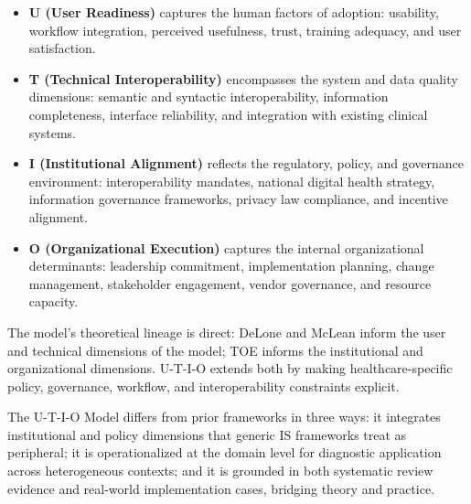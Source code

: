 \begin{itemize}
    \item \textbf{U (User Readiness)} captures the human factors of adoption: usability, workflow integration, perceived usefulness, trust, training adequacy, and user satisfaction.
    \item \textbf{T (Technical Interoperability)} encompasses the system and data quality dimensions: semantic and syntactic interoperability, information completeness, interface reliability, and integration with existing clinical systems.
    \item \textbf{I (Institutional Alignment)} reflects the regulatory, policy, and governance environment: interoperability mandates, national digital health strategy, information governance frameworks, privacy law compliance, and incentive alignment.
    \item \textbf{O (Organizational Execution)} captures the internal organizational determinants: leadership commitment, implementation planning, change management, stakeholder engagement, vendor governance, and resource capacity.
\end{itemize}

The model's theoretical lineage is direct: DeLone and McLean inform the user and technical dimensions of the model; TOE informs the institutional and organizational dimensions. U-T-I-O extends both by making healthcare-specific policy, governance, workflow, and interoperability constraints explicit.

The U-T-I-O Model differs from prior frameworks in three ways: it integrates institutional and policy dimensions that generic IS frameworks treat as peripheral; it is operationalized at the domain level for diagnostic application across heterogeneous contexts; and it is grounded in both systematic review evidence and real-world implementation cases, bridging theory and practice.

